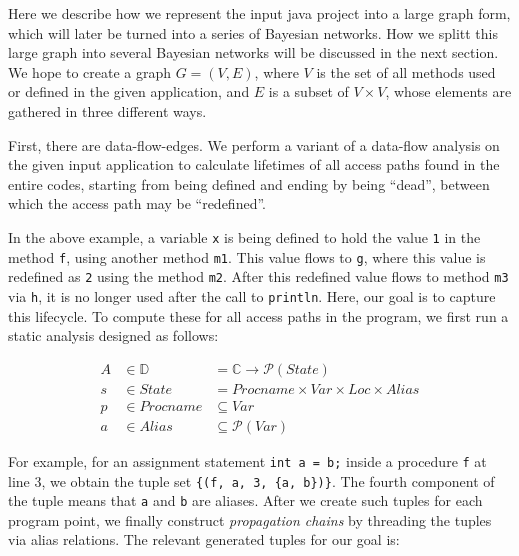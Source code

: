 \documentclass[sigconf,review,anonymous]{acmart}\settopmatter{printfolios=true,printccs=false,printacmref=false}
\begin{document}
Here we describe how we represent the input java project into a large graph form, which will
later be turned into a series of Bayesian networks. How we splitt this large
graph into several Bayesian networks will be discussed in the next section. %
We hope to create a graph $G=(V, E)$,
where $V$ is the set of all methods used or defined in the given application, and $E$ is a
subset of $V\times V$, whose elements are gathered in three different ways. 

First, there are data-flow-edges. We perform a variant of a data-flow analysis on the
given input application to calculate lifetimes of all access paths found in the
entire codes, starting from being defined and ending by being ``dead'', between
which the access path may be ``redefined''.



In the above example, a variable \texttt{x} is being defined to hold the value \texttt{1} in the method
\texttt{f}, using another method \texttt{m1}. This value flows to \texttt{g}, where this
value is redefined as \texttt{2} using the method \texttt{m2}. After this redefined
value flows to method \texttt{m3} via \texttt{h}, it is no longer used after the call to
\texttt{println}. Here, our goal is to capture this lifecycle. To compute these
for all access paths in the program, we first run a static analysis designed as follows:

\begin{align*}
  A &\in \mathbb{D} &= \mathbb{C}\rightarrow\mathcal{P}(State)\\
  s &\in State &= Procname\times Var\times Loc\times Alias\\
  p &\in Procname &\subseteq Var\\
  a &\in Alias &\subseteq \mathcal{P}(Var)
\end{align*}

For example, for an assignment statement \texttt{int a = b;} inside a procedure
\texttt{f} at line 3, we obtain the tuple set \texttt{\{(f, a, 3, \{a, b\})\}}.
The fourth component of the tuple means that \texttt{a} and \texttt{b} are
aliases. After we create such tuples for each program point, we finally construct
\emph{propagation chains} by threading the tuples via alias relations. The
relevant generated tuples for our goal is:
\end{document}

